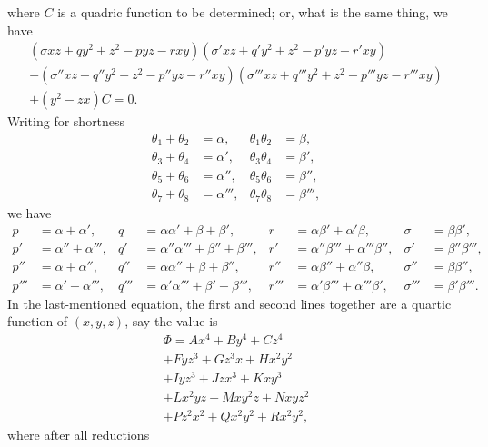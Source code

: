 \documentclass[11pt,a4paper]{article}
\theoremstyle{plain}
\begin{document}
\newpage
\noindent where $C$ is a quadric function to be determined; or, what is the same thing, we have
\begin{multline*}
(\sigma xz + qy^2 + z^2 - pyz - rxy)
(\sigma' xz + q'y^2 + z^2 - p'yz - r'xy) \\
- (\sigma'' xz + q''y^2 + z^2 - p''yz - r''xy)
(\sigma''' xz + q'''y^2 + z^2 - p'''yz - r'''xy) \\
+ (y^2 - zx)C = 0.
\end{multline*}
Writing for shortness
\begin{align*}
\theta_1 + \theta_2 &= \alpha,     & \theta_1\theta_2 &= \beta, \\
\theta_3 + \theta_4 &= \alpha',    & \theta_3\theta_4 &= \beta', \\
\theta_5 + \theta_6 &= \alpha'',   & \theta_5\theta_6 &= \beta'', \\
\theta_7 + \theta_8 &= \alpha''',  & \theta_7\theta_8 &= \beta''',
\end{align*}
we have
\begin{align*}
p  &= \alpha + \alpha', & q  &= \alpha\alpha' + \beta + \beta', & r  &= \alpha\beta' + \alpha'\beta, & \sigma &= \beta\beta', \\
p' &= \alpha'' + \alpha''', & q' &= \alpha''\alpha''' + \beta'' + \beta''', & r' &= \alpha''\beta''' + \alpha'''\beta'', & \sigma' &= \beta''\beta''', \\
p'' &= \alpha + \alpha'', & q'' &= \alpha\alpha'' + \beta + \beta'', & r'' &= \alpha\beta'' + \alpha''\beta, & \sigma'' &= \beta\beta'', \\
p''' &= \alpha' + \alpha''', & q''' &= \alpha'\alpha''' + \beta' + \beta''', & r''' &= \alpha'\beta''' + \alpha'''\beta', & \sigma''' &= \beta'\beta'''.
\end{align*}
In the last-mentioned equation, the first and second lines together are a quartic
function of $(x, y, z)$, say the value is
\begin{multline*}
\Phi = Ax^4 + By^4 + Cz^4 \\
+ Fyz^3 + Gz^3x + Hx^2y^2 \\
+ Iyz^3 + Jzx^3 + Kxy^3 \\
+ Lx^2yz + Mxy^2z + Nxyz^2 \\
+ Pz^2x^2 + Qx^2y^2 + Rx^2y^2,
\end{multline*}
where after all reductions
\end{document}
